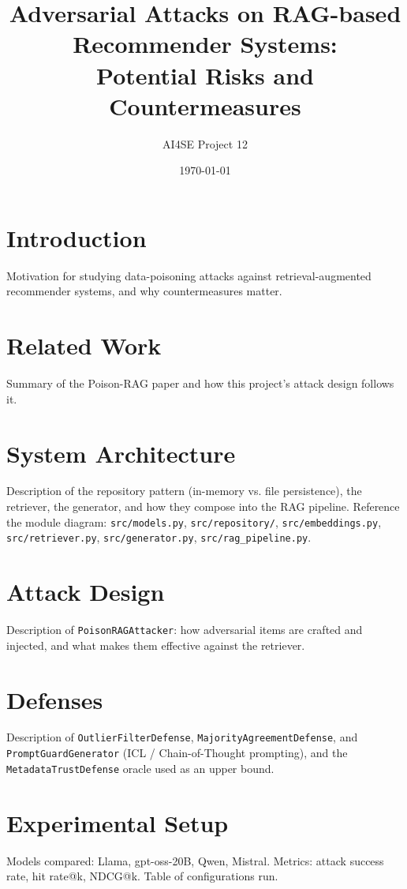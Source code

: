 \documentclass[11pt]{article}
\title{Adversarial Attacks on RAG-based Recommender Systems: \\ Potential Risks and Countermeasures}
\author{AI4SE Project 12}
\date{\today}
\begin{document}
\maketitle

\section{Introduction}
Motivation for studying data-poisoning attacks against retrieval-augmented
recommender systems, and why countermeasures matter.

\section{Related Work}
Summary of the Poison-RAG paper and how this project's attack design follows it.

\section{System Architecture}
Description of the repository pattern (in-memory vs. file persistence),
the retriever, the generator, and how they compose into the RAG pipeline.
Reference the module diagram: \texttt{src/models.py}, \texttt{src/repository/},
\texttt{src/embeddings.py}, \texttt{src/retriever.py}, \texttt{src/generator.py},
\texttt{src/rag\_pipeline.py}.

\section{Attack Design}
Description of \texttt{PoisonRAGAttacker}: how adversarial items are crafted
and injected, and what makes them effective against the retriever.

\section{Defenses}
Description of \texttt{OutlierFilterDefense}, \texttt{MajorityAgreementDefense},
and \texttt{PromptGuardGenerator} (ICL / Chain-of-Thought prompting), and the
\texttt{MetadataTrustDefense} oracle used as an upper bound.

\section{Experimental Setup}
Models compared: Llama, gpt-oss-20B, Qwen, Mistral. Metrics: attack success
rate, hit rate@k, NDCG@k. Table of configurations run.
\end{document}
